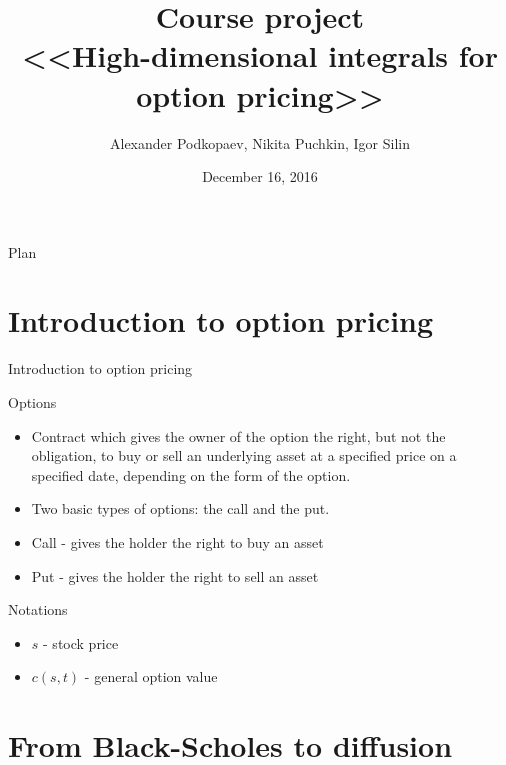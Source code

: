 \documentclass{beamer}
\theoremstyle{definition}
\theoremstyle{plain}
\theoremstyle{remark}
\begin{document}
\setlength{\abovedisplayskip}{5pt}
\setlength{\belowdisplayskip}{5pt}

	\title[\hbox to 60mm{High-dimensional integrals \hfill\insertframenumber\,/\,10}]
			{ Course project \\ <<High-dimensional integrals for option pricing>>}
	\author[A. Podkopaev, N. Puchkin, I. Silin]{\large Alexander Podkopaev, Nikita Puchkin, Igor Silin}

\date{\footnotesize{December 16, 2016}}

	\begin{frame}
		\titlepage
	\end{frame}

	\begin{frame}{Plan}
		  \tableofcontents[
		    sectionstyle=show/show,
		    subsectionstyle=show/show/show
		  ]
	\end{frame}
	
	\section{Introduction to option pricing }
	\begin{frame}{Introduction to option pricing}	 
		\begin{block}{Options}
			\begin{itemize}
				\item Contract which gives the owner of the option the right, but not the obligation, to buy or sell an underlying asset at a specified price on a specified date, depending on the form of the option.
				\item Two basic types of options: the call and the put.
				\item Call -  gives the holder the right to buy an asset 
				\item Put - gives the holder the right to sell an asset
			\end{itemize}
		\end{block}
		\begin{block}{Notations}
			\begin{itemize}
				\item $s$ - stock price 
				\item $c(s,t)$ - general option value
			\end{itemize}
		\end{block}	 
	\end{frame}

	\section{From Black-Scholes to diffusion }
\end{document}
